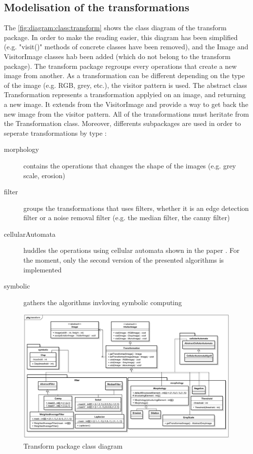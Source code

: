 \subsection{Modelisation of the transformations}


The \vref{fig:diagram:class:transform} shows the class diagram of the transform package. In order to make the reading easier, this diagram has been simplified (e.g. "visit()" methods of concrete classes have been removed), and the Image and VisitorImage classes hab been added (which do not belong to the transform package). The transform package regroups every operations that create a new image from another. As a transformation can be different depending on the type of the image (e.g. RGB, grey, etc.), the visitor pattern is used. The abstract class Transformation represents a transformation applyied on an image, and returning a new image. It extends from the VisitorImage and provide a way to get back the new image from the visitor pattern. All of the transformations must heritate from the Transformation class. Moreover, differents subpackages are used in order to seperate transformations by type : 
\begin{description}
	\item[morphology] contains the operations that changes the shape of the images (e.g. grey scale, erosion)
	\item[filter] groups the transformations that uses filters, whether it is an edge detection filter or a noise removal filter (e.g. the median filter, the canny filter)
	\item[cellularAutomata] huddles the operations using cellular automata shown in the paper \cite{bib:filter:CA}. For the moment, only the second version of the presented algorithms is implemented
	\item[symbolic] gathers the algorithms invloving symbolic computing
\end{description}



\begin{figure}[h]
	\centering
	\includegraphics[width=1\textwidth]{images/diagrams/class_diagram_transform}
	\caption{Transform package class diagram}
	\label{fig:diagram:class:transform}
\end{figure}


